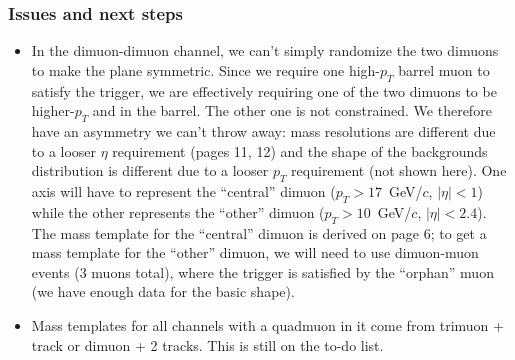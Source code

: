 \documentclass[compress]{beamer}
\begin{document}
\begin{frame}
\frametitle{Issues and next steps}
\begin{itemize}
\item In the dimuon-dimuon channel, we can't simply randomize the two dimuons to make the plane symmetric.  Since we require one high-$p_T$ barrel muon to satisfy the trigger, we are effectively requiring one of the two dimuons to be higher-$p_T$ and in the barrel.  The other one is not constrained.  We therefore have an asymmetry we can't throw away: mass resolutions are different due to a looser $\eta$ requirement (pages 11, 12) and the shape of the backgrounds distribution is different due to a looser $p_T$ requirement (not shown here).  One axis will have to represent the ``central'' dimuon ($p_T > 17$~GeV/$c$, $|\eta| < 1$) while the other represents the ``other'' dimuon ($p_T > 10$~GeV/$c$, $|\eta| < 2.4$).  The mass template for the ``central'' dimuon is derived on page 6; to get a mass template for the ``other'' dimuon, we will need to use dimuon-muon events (3 muons total), where the trigger is satisfied by the ``orphan'' muon (we have enough data for the basic shape).
\item Mass templates for all channels with a quadmuon in it come from trimuon + track or dimuon + 2 tracks.  This is still on the to-do list.
\end{itemize}
\label{numpages}
\end{frame}
\end{document}

